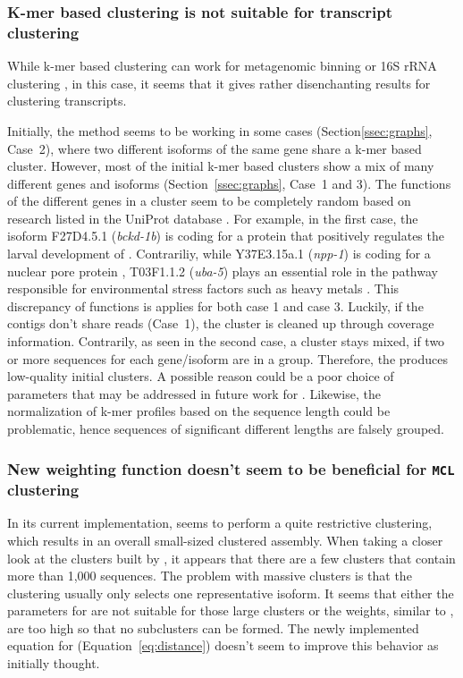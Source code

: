 \documentclass[12pt,a4paper,english]{article}
\begin{document}
	\subsubsection{K-mer based clustering is not suitable for transcript clustering}
	\label{ssec:discussion:karma}
	While k-mer based clustering can work for metagenomic binning \citep{binning:16} or 16S rRNA clustering \citep{16SrRNA:13}, in this case, it seems that it gives rather disenchanting results for clustering transcripts.

	Initially, the method seems to be working in some cases (Section\ref{ssec:graphs}, Case~2), where two different isoforms of the same gene share a k-mer based cluster.
	However, most of the initial k-mer based clusters show a mix of many different genes and isoforms (Section~\ref{ssec:graphs}, Case~1 and 3).
    The functions of the different genes in a cluster seem to be completely random based on research listed in the UniProt database \citep{uniprot:18}.
	For example, in the first case, the isoform F27D4.5.1 (\textit{bckd-1b}) is coding for a protein that positively regulates the larval development of \celegans \citep{F27:16}.
	Contrariliy, while Y37E3.15a.1 (\textit{npp-1}) is coding for a nuclear pore protein \citep{Y37:03}, T03F1.1.2 (\textit{uba-5}) plays an essential role in the pathway responsible for environmental stress factors such as heavy metals \citep{T03:13}. This discrepancy of functions is applies for both case 1 and case 3.
	Luckily, if the contigs don't share reads (Case~1), the cluster is cleaned up through coverage information. Contrarily, as seen in the second case, a cluster stays mixed, if two or more sequences for each gene/isoform are in a group. Therefore, the \hdbscan produces low-quality initial clusters.
	A possible reason could be a poor choice of parameters that may be addressed in future work for \karma. Likewise, the normalization of k-mer profiles based on the sequence length could be problematic, hence sequences of significant different lengths are falsely grouped.
	
	\subsubsection{New weighting function doesn't seem to be beneficial for \texttt{MCL} clustering}
	In its current implementation, \karma seems to perform a quite restrictive clustering, which results in an overall small-sized clustered assembly.
	When taking a closer look at the clusters built by \karma, it appears that there are a few clusters that contain more than 1,000 sequences. The problem with massive clusters is that the \mcl clustering usually only selects one representative isoform. It seems that either the parameters for \mcl are not suitable for those large clusters or the weights, similar to \grouper, are too high so that no subclusters can be formed.
	The newly implemented equation for \karma (Equation~\ref{eq:distance}) doesn't seem to improve this behavior as initially thought.
	
\end{document}
